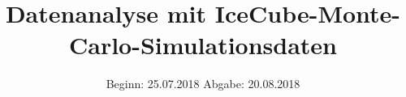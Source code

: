 

\subject{Lehrstuhlversuch E5b}
\title{Datenanalyse mit IceCube-Monte-Carlo-Simulationsdaten}
\date{
	Beginn: 25.07.2018
	\hspace{3em}
	Abgabe: 20.08.2018
}


	
	\maketitle
	\newpage
	
	
	
	
	
	
	
	\printbibliography
	


